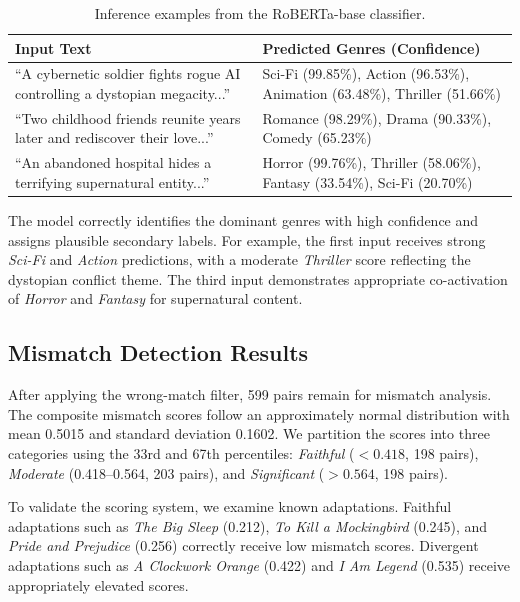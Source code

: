 \documentclass[11pt,a4paper]{article}
\begin{document}
\begin{table}[H]
\centering
\caption{Inference examples from the RoBERTa-base classifier.}
\label{tab:inference}
\small
\begin{tabularx}{\textwidth}{p{5.5cm}X}
\toprule
\textbf{Input Text} & \textbf{Predicted Genres (Confidence)} \\
\midrule
``A cybernetic soldier fights rogue AI controlling a dystopian megacity...'' &
Sci-Fi (99.85\%), Action (96.53\%), Animation (63.48\%), Thriller (51.66\%) \\
\midrule
``Two childhood friends reunite years later and rediscover their love...'' &
Romance (98.29\%), Drama (90.33\%), Comedy (65.23\%) \\
\midrule
``An abandoned hospital hides a terrifying supernatural entity...'' &
Horror (99.76\%), Thriller (58.06\%), Fantasy (33.54\%), Sci-Fi (20.70\%) \\
\bottomrule
\end{tabularx}
\end{table}

The model correctly identifies the dominant genres with high confidence and assigns plausible secondary labels. For example, the first input receives strong \textit{Sci-Fi} and \textit{Action} predictions, with a moderate \textit{Thriller} score reflecting the dystopian conflict theme. The third input demonstrates appropriate co-activation of \textit{Horror} and \textit{Fantasy} for supernatural content.

\subsection{Mismatch Detection Results}

After applying the wrong-match filter, 599 pairs remain for mismatch analysis. The composite mismatch scores follow an approximately normal distribution with mean 0.5015 and standard deviation 0.1602. We partition the scores into three categories using the 33rd and 67th percentiles: \textit{Faithful} ($< 0.418$, 198 pairs), \textit{Moderate} (0.418--0.564, 203 pairs), and \textit{Significant} ($> 0.564$, 198 pairs).

To validate the scoring system, we examine known adaptations. Faithful adaptations such as \textit{The Big Sleep} (0.212), \textit{To Kill a Mockingbird} (0.245), and \textit{Pride and Prejudice} (0.256) correctly receive low mismatch scores. Divergent adaptations such as \textit{A Clockwork Orange} (0.422) and \textit{I Am Legend} (0.535) receive appropriately elevated scores.
\end{document}

